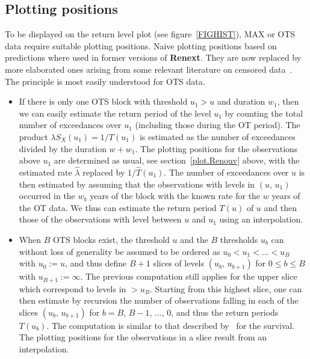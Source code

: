 \documentclass[a4paper]{report}
\newcommand{\pkg}[1]{\textbf{#1}}
\begin{document}
\subsection{Plotting positions}
\label{MAXPLOTPOS}
To be displayed on the return level plot (see figure~\ref{FIGHIST}),
MAX or OTS data require suitable plotting positions. Naive
plotting positions based on predictions where used in former
versions of \pkg{Renext}. They are now replaced by more elaborated
ones arising from some relevant literature on censored data~\citep{EnvStat}. 
The principle is most easily understood for OTS data. 
\begin{itemize}
\item If there is only one OTS block with threshold $u_1>u$ and
  duration $w_1$, then we can easily estimate the return period of the
  level $u_1$ by counting the total number of exceedances over $u_1$
  (including those during the OT period). The product $\lambda
  S_X(u_1) = 1/T(u_1)$ is estimated as the number of exceedances
  divided by the duration $w + w_1$. The plotting positions for the 
  observations above $u_1$ are determined as usual, see 
  section~\ref{plot.Renouv} above, with the estimated rate $\widehat{\lambda}$ 
  replaced by $1 / \widehat{T}(u_1)$.  The number of
  exceedances over $u$ is then estimated by assuming that the
  observations with levels in $(u, \,u_1)$ occurred in the $w_b$ 
  years of the block with the known rate for the $w$ years of the
  OT data. We thus can estimate the return period $T(u)$ 
  of $u$ and then those of the observations with level
  between $u$ and $u_1$ using an interpolation.

\item When $B$ OTS blocks exist, the threshold $u$ and the $B$
  thresholds $u_b$ can without loss of generality be assumed to be
  ordered as $u_{0} < u_{1} < \dots < u_{B}$ with $u_{0} := u$, and
  thus define $B +1$ slices of levels $(u_{b},\,u_{b+1})$ for $0
  \leqslant b \leqslant B$ with $u_{B+1} := \infty$. The previous
  computation still applies for the upper slice which correspond to
  levels in $>u_{B}$.  Starting from this highest slice, one can
  then estimate by recursion the number of observations falling in
  each of the slices $(u_{b},\,u_{b+1})$ for $b=B$, $B-1$, $\dots$,
  $0$, and thus the return periods $T(u_{b})$.  The computation is
  similar to that described by~\citet{HirschStedinger} for the
  survival. The plotting positions for the observations in a slice
  result from an interpolation.
\end{itemize}
\end{document}

